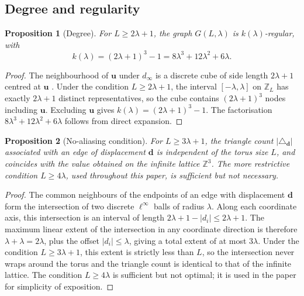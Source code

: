 \documentclass[aps,pre,onecolumn,10pt,groupedaddress,amsmath,amssymb,floatfix]{revtex4-2}
\newtheorem{proposition}{Proposition}
\begin{document}
\subsection{Degree and regularity}

\begin{proposition}[Degree]
\label{prop:degree}
For $L \ge 2\lambda + 1$, the graph $G(L, \lambda)$ is $k(\lambda)$-regular, with
\begin{equation}
k(\lambda) = (2\lambda+1)^3 - 1 = 8\lambda^3 + 12\lambda^2 + 6\lambda.
\label{eq:k_degree}
\end{equation}
\end{proposition}
\begin{proof}
The neighbourhood of $\mathbf{u}$ under $d_\infty$ is a discrete cube of side length $2\lambda + 1$ centred at $\mathbf{u}$ \cite{ashcroft1976solid}. Under the condition $L \ge 2\lambda + 1$, the interval $[-\lambda, \lambda]$ on $\mathbb{Z}_L$ has exactly $2\lambda + 1$ distinct representatives, so the cube contains $(2\lambda+1)^3$ nodes including $\mathbf{u}$. Excluding $\mathbf{u}$ gives $k(\lambda) = (2\lambda+1)^3 - 1$. The factorisation $8\lambda^3 + 12\lambda^2 + 6\lambda$ follows from direct expansion.
\end{proof}

\begin{proposition}[No-aliasing condition]
\label{prop:no_aliasing}
For $L \ge 3\lambda + 1$, the triangle count $|\triangle_{\mathbf{d}}|$ associated with an edge of displacement $\mathbf{d}$ is independent of the torus size $L$, and coincides with the value obtained on the infinite lattice $\mathbb{Z}^3$. The more restrictive condition $L \ge 4\lambda$, used throughout this paper, is sufficient but not necessary.
\end{proposition}
\begin{proof}
The common neighbours of the endpoints of an edge with displacement $\mathbf{d}$ form the intersection of two discrete $\ell^\infty$ balls of radius $\lambda$. Along each coordinate axis, this intersection is an interval of length $2\lambda + 1 - |d_i| \le 2\lambda + 1$. The maximum linear extent of the intersection in any coordinate direction is therefore $\lambda + \lambda = 2\lambda$, plus the offset $|d_i| \le \lambda$, giving a total extent of at most $3\lambda$. Under the condition $L \ge 3\lambda + 1$, this extent is strictly less than $L$, so the intersection never wraps around the torus and the triangle count is identical to that of the infinite lattice. The condition $L \ge 4\lambda$ is sufficient but not optimal; it is used in the paper for simplicity of exposition.
\end{proof}
\end{document}
